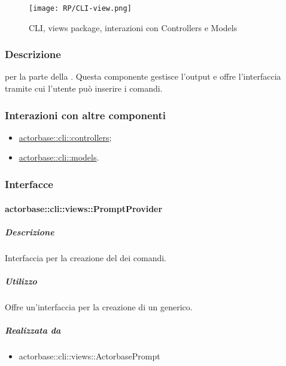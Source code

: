 \documentclass{scalatekids-article}
\begin{document}
\begin{figure}[H]
  \begin{center}
    \texttt{[image: RP/CLI-view.png]}
    \caption{CLI, views package, interazioni con Controllers e Models}
  \end{center}
\end{figure}

\subsubsection{Descrizione}

 per la parte  della . Questa componente
gestisce l'output e offre l'interfaccia tramite cui l'utente può inserire i
comandi.

\subsubsection{Interazioni con altre componenti}

\begin{itemize}
\item \hyperref[sec:actorbase::cli::controllers]{actorbase::cli::controllers};
\item \hyperref[sec:actorbase::cli::models]{actorbase::cli::models}.
\end{itemize}

\subsubsection{Interfacce}

\paragraph{actorbase::cli::views::PromptProvider}
\label{sec:actorbase::cli::views::PromptProvider}

\subparagraph{Descrizione}

Interfaccia per la creazione del  dei comandi.

\subparagraph{Utilizzo}

Offre un'interfaccia per la creazione di un  generico.

\subparagraph{Realizzata da}

\begin{itemize}
\item actorbase::cli::views::ActorbasePrompt
\end{itemize}
\end{document}
